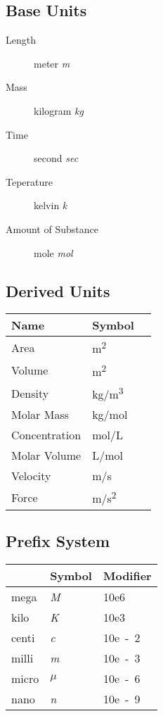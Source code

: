 \subsection{Base Units}
\begin{description}
  \item[Length] meter \textit{m}
  \item[Mass] kilogram \textit{kg}
  \item[Time] second \textit{sec}
  \item[Teperature] kelvin \textit{k}
  \item[Amount of Substance] mole \textit{mol}
\end{description}

\subsection{Derived Units}
\begin{table}[H]
\begin{tabular}{@{}lll@{}}
\toprule
Name          & Symbol      \\ \midrule
Area          & \si{m^2}    \\
Volume        & \si{m^2}    \\
Density       & \si{kg/m^3} \\
Molar Mass    & \si{kg/mol} \\
Concentration & \si{mol/L}  \\
Molar Volume  & \si{L/mol}  \\
Velocity      & \si{m/s}    \\
Force         & \si{m/s^2}  \\ \bottomrule
\end{tabular}
\end{table}

\subsection{Prefix System}
\begin{table}[H]
\begin{tabular}{@{}lll@{}}
\toprule
        & Symbol      & Modifier   \\ \midrule
  mega  & \textit{M}  & \si{10e6}  \\
  kilo  & \textit{K}  & \si{10e3}  \\
  centi & \textit{c}  & \si{10e-2} \\
  milli & \textit{m}  & \si{10e-3} \\
  micro & $\mu$       & \si{10e-6} \\
  nano  & \textit{n}  & \si{10e-9} \\ \bottomrule
\end{tabular}
\end{table}

